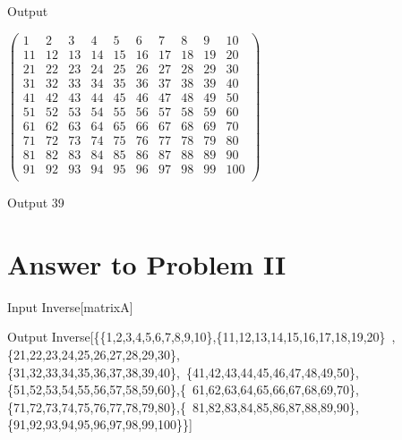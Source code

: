 \documentclass[11pt,a4paper]{article}
\begin{document}
\begin{mmaCell}[form=MatrixForm]{Output}

\end{mmaCell}

\begin{doublespace}
\noindent\(\left(
\begin{array}{cccccccccc}
 1 & 2 & 3 & 4 & 5 & 6 & 7 & 8 & 9 & 10 \\
 11 & 12 & 13 & 14 & 15 & 16 & 17 & 18 & 19 & 20 \\
 21 & 22 & 23 & 24 & 25 & 26 & 27 & 28 & 29 & 30 \\
 31 & 32 & 33 & 34 & 35 & 36 & 37 & 38 & 39 & 40 \\
 41 & 42 & 43 & 44 & 45 & 46 & 47 & 48 & 49 & 50 \\
 51 & 52 & 53 & 54 & 55 & 56 & 57 & 58 & 59 & 60 \\
 61 & 62 & 63 & 64 & 65 & 66 & 67 & 68 & 69 & 70 \\
 71 & 72 & 73 & 74 & 75 & 76 & 77 & 78 & 79 & 80 \\
 81 & 82 & 83 & 84 & 85 & 86 & 87 & 88 & 89 & 90 \\
 91 & 92 & 93 & 94 & 95 & 96 & 97 & 98 & 99 & 100 \\
\end{array}
\right)\)
\end{doublespace}

\begin{mmaCell}{Output}
39
\end{mmaCell}

\section{Answer to Problem II}\label{sec:P02}

\begin{mmaCell}[moredefined={matrixA}]{Input}
Inverse[matrixA]
\end{mmaCell}

\begin{mmaCell}{Output}
Inverse[\{\{1,2,3,4,5,6,7,8,9,10\},\{11,12,13,14,15,16,17,18,19,20\}\
,\{21,22,23,24,25,26,27,28,29,30\},\{31,32,33,34,35,36,37,38,39,40\},\
\{41,42,43,44,45,46,47,48,49,50\},\{51,52,53,54,55,56,57,58,59,60\},\{\
61,62,63,64,65,66,67,68,69,70\},\{71,72,73,74,75,76,77,78,79,80\},\{\
81,82,83,84,85,86,87,88,89,90\},\{91,92,93,94,95,96,97,98,99,100\}\}]
\end{mmaCell}
\end{document}
